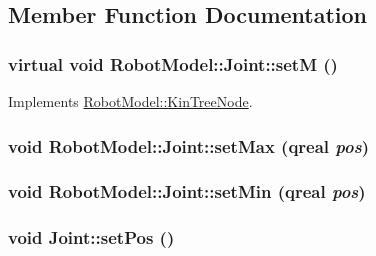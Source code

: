 \subsection{Member Function Documentation}
\hypertarget{class_robot_model_1_1_joint_a485f5fc46f5156a7383bee7edbfc6643}{
\subsubsection[{setM}]{\setlength{\rightskip}{0pt plus 5cm}virtual void RobotModel::Joint::setM ()}}
\label{class_robot_model_1_1_joint_a485f5fc46f5156a7383bee7edbfc6643}


Implements \hyperlink{class_robot_model_1_1_kin_tree_node_a47574c65af53990455540547d8d00e9f}{RobotModel::KinTreeNode}.\hypertarget{class_robot_model_1_1_joint_a48523fd1cf98af4b0856257cde75f486}{
\subsubsection[{setMax}]{\setlength{\rightskip}{0pt plus 5cm}void RobotModel::Joint::setMax (qreal {\em pos})}}
\label{class_robot_model_1_1_joint_a48523fd1cf98af4b0856257cde75f486}
\hypertarget{class_robot_model_1_1_joint_ad982580bf8c0d721babaf93d990cf5d7}{
\subsubsection[{setMin}]{\setlength{\rightskip}{0pt plus 5cm}void RobotModel::Joint::setMin (qreal {\em pos})}}
\label{class_robot_model_1_1_joint_ad982580bf8c0d721babaf93d990cf5d7}
\hypertarget{class_robot_model_1_1_joint_a4fc5a8c53c2a2c5839409d90fb0825e1}{
\subsubsection[{setPos}]{\setlength{\rightskip}{0pt plus 5cm}void Joint::setPos ()}}
\label{class_robot_model_1_1_joint_a4fc5a8c53c2a2c5839409d90fb0825e1}


